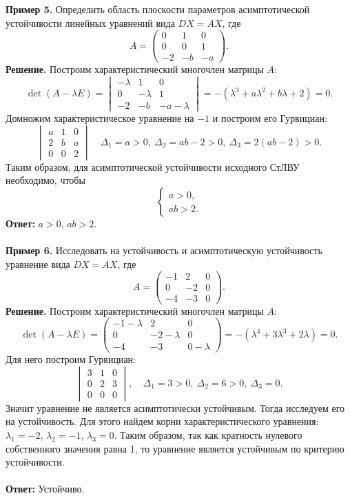 \documentclass[a4paper, 12pt]{article}
\begin{document}
\textbf{Пример 5.} Определить область плоскости параметров асимптотической устойчивости линейных уравнений вида $DX = AX$, где
$$A = \begin{pmatrix}
	0 & 1 & 0\\
	0 & 0 & 1\\
	-2 & -b & -a
\end{pmatrix}.$$
\textbf{Решение.} Построим характеристический многочлен матрицы $A$:
$$\det(A-\lambda E) = \begin{vmatrix}
	 - \lambda & 1 & 0\\
	0 & -\lambda & 1\\
	-2 & -b & -a - \lambda
\end{vmatrix} = - (\lambda^3 + a\lambda^2 + b\lambda + 2) = 0.$$
Домножим характеристическое уравнение на $-1$ и построим его Гурвициан:
$$\begin{vmatrix}
	a & 1 & 0\\
	2 & b & a\\
	0 & 0 & 2
\end{vmatrix}\quad \Delta_1 = a > 0,\ \Delta_2 = ab - 2 > 0,\ \Delta_3 = 2(ab - 2) > 0.$$
Таким образом, для асимптотической устойчивости исходного СтЛВУ необходимо, чтобы $$\begin{cases}
	a > 0,\\
	ab > 2.
\end{cases}$$
\textbf{Ответ:} $a > 0$, $ab > 2$.\\\\
\textbf{Пример 6.}  Исследовать на устойчивость и асимптотическую устойчивость уравнение вида $DX = AX$, где $$A = \begin{pmatrix}
	-1 & 2 & 0\\
	0 & -2 & 0\\
	-4 & -3 & 0
\end{pmatrix}.$$ 
\textbf{Решение.} Построим характеристический многочлен матрицы $A$:
$$\det(A - \lambda E) = \begin{pmatrix}
	-1 - \lambda & 2 & 0\\
	0 & -2 -\lambda& 0\\
	-4 & -3 & 0 - \lambda
\end{pmatrix} = -(\lambda^4 + 3\lambda^3 + 2\lambda) =0.$$
Для него построим Гурвициан:
$$\begin{vmatrix}
	3 & 1 & 0\\
	0 & 2 & 3\\
	0 & 0 & 0
\end{vmatrix},\quad \Delta_1 = 3>0,\ \Delta_2 = 6 > 0,\ \Delta_3 = 0.$$
Значит уравнение не является асимптотически устойчивым. Тогда исследуем его на устойчивость. Для этого найдем корни характеристического уравнения:
$\lambda_1 = -2$, $\lambda_2 = -1$, $\lambda_3 = 0$. Таким образом, так как кратность нулевого собственного значения равна 1, то уравнение является устойчивым по критерию устойчивости.\\\\
\textbf{Ответ:} Устойчиво.
\end{document}
